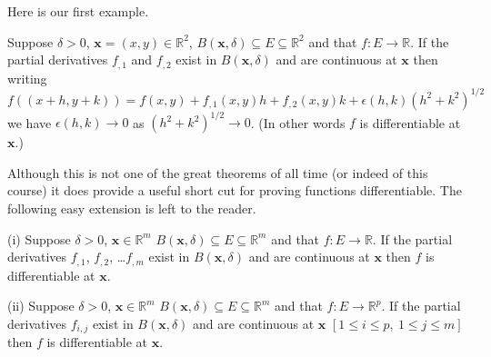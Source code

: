 Here is our first example.
\begin{theorem}\label{continuous first} Suppose $\delta>0$,
${\mathbf x}=(x,y)\in{\mathbb R}^{2}$,
$B({\mathbf x},\delta)\subseteq  E\subseteq {\mathbb R}^{2}$
and that $f:E\rightarrow{\mathbb R}$. If  the partial
derivatives $f_{,1}$ and $f_{,2}$ exist in $B({\mathbf x},\delta)$
and are continuous at ${\mathbf x}$ then writing
\[f((x+h,y+k))=f(x,y)+f_{,1}(x,y)h+f_{,2}(x,y)k+
\epsilon(h,k)(h^{2}+k^{2})^{1/2}\]
we have $\epsilon(h,k)\rightarrow 0$ as
$(h^{2}+k^{2})^{1/2}\rightarrow 0$.  (In other words
$f$ is differentiable at ${\mathbf x}$.)
\end{theorem}
Although this is not one of the great theorems
of all time (or indeed of this course) it does provide
a useful short cut for proving functions differentiable.
The following easy extension is left to the reader.
\begin{theorem}
(i) Suppose $\delta>0$,
${\mathbf x}\in{\mathbb R}^{m}$
$B({\mathbf x},\delta)\subseteq  E\subseteq {\mathbb R}^{m}$
and that $f:E\rightarrow{\mathbb R}$. If  the partial
derivatives $f_{,1}$, $f_{,2}$, \dots $f_{,m}$ 
exist in $B({\mathbf x},\delta)$
and are continuous at ${\mathbf x}$ then 
$f$ is differentiable at ${\mathbf x}$.

(ii)  Suppose $\delta>0$,
${\mathbf x}\in{\mathbb R}^{m}$
$B({\mathbf x},\delta)\subseteq  E\subseteq {\mathbb R}^{m}$
and that $f:E\rightarrow{\mathbb R}^{p}$. If  the partial
derivatives $f_{i,j}$ 
exist in $B({\mathbf x},\delta)$
and are continuous at ${\mathbf x}$ 
$[1\leq i\leq p,\ 1\leq j\leq m]$ then 
$f$ is differentiable at ${\mathbf x}$.
\end{theorem}

